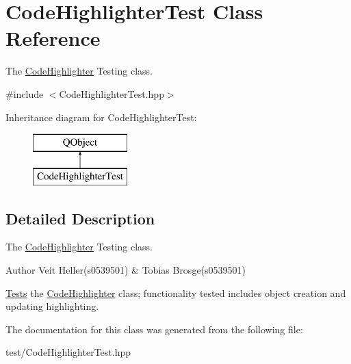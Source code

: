 \hypertarget{classCodeHighlighterTest}{\section{Code\+Highlighter\+Test Class Reference}
\label{classCodeHighlighterTest}
}


The \hyperlink{classCodeHighlighter}{Code\+Highlighter} Testing class.  




{\ttfamily \#include $<$Code\+Highlighter\+Test.\+hpp$>$}

Inheritance diagram for Code\+Highlighter\+Test\+:\begin{figure}[H]
\begin{center}
\leavevmode
\includegraphics[height=2.000000cm]{classCodeHighlighterTest}
\end{center}
\end{figure}


\subsection{Detailed Description}
The \hyperlink{classCodeHighlighter}{Code\+Highlighter} Testing class. 

\begin{DoxyAuthor}{Author}
Veit Heller(s0539501) \& Tobias Brosge(s0539501)
\end{DoxyAuthor}
\hyperlink{structTests}{Tests} the \hyperlink{classCodeHighlighter}{Code\+Highlighter} class; functionality tested includes object creation and updating highlighting. 

The documentation for this class was generated from the following file\+:\begin{DoxyCompactItemize}
\item 
test/Code\+Highlighter\+Test.\+hpp\end{DoxyCompactItemize}
